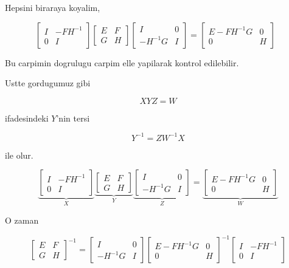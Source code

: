 \documentclass[12pt,fleqn]{article}\usepackage{../common}
\begin{document}
Hepsini biraraya koyalim, 

\[ 
\left[\begin{array}{rr}
I & -FH^{-1} \\
0 & I
\end{array}\right] 
\left[\begin{array}{rr}
E & F \\
G & H
\end{array}\right] 
\left[\begin{array}{rr}
I & 0 \\
-H^{-1}G & I
\end{array}\right] 
= 
\left[\begin{array}{rr}
E-FH^{-1}G & 0 \\
0 & H
\end{array}\right] 
\ \ \ \label{2}
 \]

Bu carpimin dogrulugu carpim elle yapilarak kontrol edilebilir.

Ustte gordugumuz gibi 

\[ XYZ = W \]

ifadesindeki $Y$'nin tersi 

\[ Y^{-1} = ZW^{-1}X \]

ile olur. 

\[ 
\underbrace{
\left[\begin{array}{rr}
I & -FH^{-1} \\
0 & I
\end{array}\right] 
}_{X}
\underbrace{
\left[\begin{array}{rr}
E & F \\
G & H
\end{array}\right] 
}_{Y}
\underbrace{
\left[\begin{array}{rr}
I & 0 \\
-H^{-1}G & I
\end{array}\right] 
}_{Z}
= 
\underbrace{
\left[\begin{array}{rr}
E-FH^{-1}G & 0 \\
0 & H
\end{array}\right] 
}_{W}
 \]


O zaman 

\[ 
\left[\begin{array}{rr}
E & F \\
G & H
\end{array}\right]^{-1}
=
\left[\begin{array}{rr}
I & 0 \\
-H^{-1}G & I
\end{array}\right] 
\left[\begin{array}{rr}
E-FH^{-1}G & 0 \\
0 & H
\end{array}\right]^{-1}
\left[\begin{array}{rr}
I & -FH^{-1} \\
0 & I
\end{array}\right] 
 \]
\end{document}
